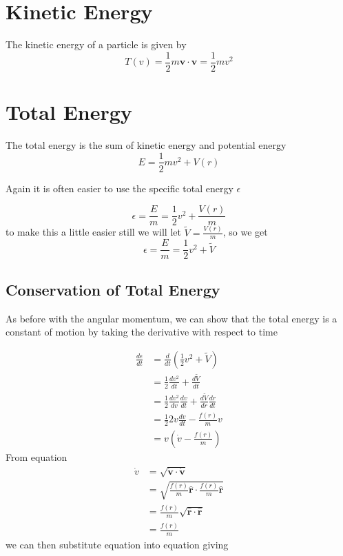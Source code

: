 \section{Kinetic Energy}
The kinetic energy of a particle is given by
\begin{equation}
T(v)=\frac{1}{2}m\mathbf{v}\cdot\mathbf{v} = \frac{1}{2} m v^2\label{eq:central-KineticEnergy}
\end{equation}

\section{Total Energy}
The total energy is the sum of kinetic energy and potential energy
\begin{equation}
E =\frac{1}{2} m v^2 + V(r)
\end{equation}

Again it is often easier to use the specific total energy $\epsilon$

\begin{equation}
\epsilon=\frac{E}{m}=\frac{1}{2} v^2 + \frac{V(r)}{m}
\end{equation}
to make this a little easier still we will let $\tilde{V}=\frac{V(r)}{m}$, so we get
\begin{equation}
\epsilon=\frac{E}{m}=\frac{1}{2} v^2 +\tilde{V}
\end{equation}

\subsection{Conservation of Total Energy}
As before with the angular momentum, we can show that the total energy is a constant of motion by taking the derivative with respect to time

\begin{align}
\frac{d\epsilon}{dt}&=\frac{d}{dt}\left(\frac{1}{2} v^2 + \tilde{V}\right)\nonumber \\
&=\frac{1}{2} \frac{d v^2}{dt}+ \frac{d\tilde{V}}{dt}\nonumber \\
&=\frac{1}{2} \frac{d v^2}{dv}\frac{d v}{dt}+ \frac{d\tilde{V}}{dr}\frac{d r}{dt}\nonumber \\
&=\frac{1}{2} 2v\frac{d v}{dt}-\frac{f(r)}{m}v\nonumber \\
&=v\left(\dot{v}-\frac{f(r)}{m}\right)\label{eq:central4}
\end{align}
From equation 
\begin{align}
\dot{v} &= \sqrt{\dot{\mathbf{v}}\cdot\dot{\mathbf{v}}}\nonumber \\
&=\sqrt{ \frac{f(r)}{m} \hat{\mathbf{r}} \cdot \frac{f(r)}{m} \hat{\mathbf{r}}}\nonumber \\
&= \frac{f(r)}{m} \sqrt{ \hat{\mathbf{r}} \cdot \hat{\mathbf{r}}}\nonumber \\
&= \frac{f(r)}{m} \label{eq:central5}
\end{align}
we can then substitute equation  into equation  giving

